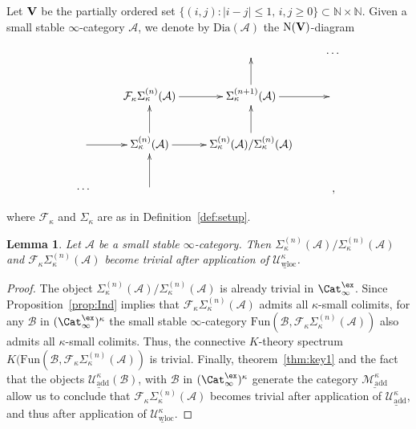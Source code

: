 \documentclass{amsart}
\newcommand{\cA}{{\mathcal A}}
\newcommand{\cB}{{\mathcal B}}
\newcommand{\cF}{{\mathcal F}}
\newcommand{\cM}{{\mathcal M}}
\newcommand{\cU}{{\mathcal U}}
\newcommand{\bbN}{\mathbb{N}}
\newcommand{\N}{\mathrm{N}}
\newcommand{\stabcat}{\Cat_\i^{\ex}}
\newcommand{\Fun}{\mathrm{Fun}} %
\renewcommand{\i}{\infty}
\newcommand{\uMotadd}{\underline{\cM_{\mathrm{add}}^\kappa}}
\newcommand{\uUmot}{\underline{\cU_{\mathrm{add}}^\kappa}}
\newcommand{\uwUloc}{\underline{\cU_{\mathrm{wloc}}^\kappa}}
\newcommand{\kcone}{\cF_{\kappa}}
\newcommand{\ksusp}{\Sigma_{\kappa}}
\numberwithin{equation}{section}
\newtheorem{lemma}[equation]{Lemma}
\theoremstyle{definition}
\begin{document}
Let ${\bf V}$ be the partially ordered set $\{(i,j): |i-j|\leq 1,\,
i,j \geq 0 \} \subset \bbN \times \bbN$. Given a small stable
$\i$-category $\cA$, we denote by $\mathrm{Dia}(\cA)$ the $\N({\bf
V})$-diagram

\begin{equation}\label{eq:dia-spec}
\xymatrix{
 &  &  & \cdots \\
 & \kcone \ksusp^{(n)}(\cA) \ar[r] & \ksusp^{(n+1)}(\cA) \ar[u] \ar[r] &  \\
 \ar[r] & \ksusp^{(n)}(\cA) \ar[u] \ar[r] & \ksusp^{(n)}(\cA)/\ksusp^{(n)}(\cA) \ar[u] & \\
\cdots & \ar[u] & & \,,
}
\end{equation}

where $\kcone$ and $\ksusp$ are as in Definition~\ref{def:setup}.

\begin{lemma}\label{lem:trivial}
Let $\cA$ be a small stable $\i$-category. Then
$\ksusp^{(n)}(\cA)/\ksusp^{(n)}(\cA)$ and $\kcone\ksusp^{(n)}(\cA)$
become trivial after application of $\uwUloc$.
\end{lemma}

\begin{proof}
The object $\ksusp^{(n)}(\cA)/\ksusp^{(n)}(\cA)$ is already trivial in
$\stabcat$.  Since Proposition~\ref{prop:Ind} implies that
$\kcone\ksusp^{(n)}(\cA)$ admits all $\kappa$-small colimits, for any
$\cB$ in $(\stabcat)^\kappa$ the small stable $\i$-category
$\Fun(\cB, \kcone \ksusp^{(n)}(\cA))$ also admits all $\kappa$-small
colimits.  Thus, the connective $K$-theory spectrum
$K(\Fun(\cB, \kcone \ksusp^{(n)}(\cA))$ is trivial.  Finally,
theorem~\ref{thm:key1} and the fact that the objects $\uUmot(\cB)$,
with $\cB$ in $(\stabcat)^\kappa$ generate the category
$\uMotadd$ \cite[5.5.7.3]{HTT} allow us to conclude that
$\kcone \ksusp^{(n)}(\cA)$ becomes trivial after application of
$\uUmot$, and thus after application of $\uwUloc$.
\end{proof}
\end{document}
